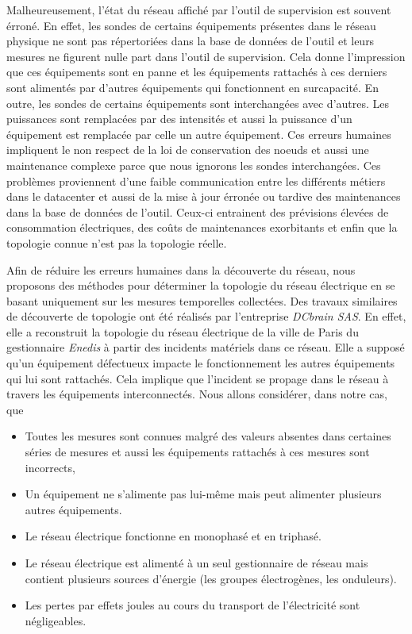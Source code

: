 Malheureusement,  l'\'etat du r\'eseau affich\'e par l'outil de supervision est souvent \'erron\'e. 
En effet,  les sondes de certains \'equipements pr\'esentes dans le r\'eseau physique ne sont pas r\'epertori\'ees dans la base de donn\'ees de l'outil et leurs mesures ne figurent nulle part dans l'outil de supervision. Cela donne l'impression que ces \'equipements sont en panne et  les \'equipements rattach\'es \`a ces derniers sont aliment\'es par d'autres \'equipements qui fonctionnent en surcapacit\'e.  
En outre, les sondes de certains \'equipements sont interchang\'ees avec d'autres. Les puissances sont remplac\'ees par des intensit\'es et aussi la puissance d'un \'equipement est remplac\'ee par celle  un autre \'equipement. Ces erreurs humaines impliquent le non respect de la loi de conservation des noeuds et aussi une maintenance complexe  parce que nous ignorons les sondes interchang\'ees.
Ces probl\`emes proviennent d'une faible communication  entre les diff\'erents m\'etiers dans le datacenter et aussi de la mise \`a jour \'erron\'ee ou tardive des maintenances dans la base de donn\'ees de l'outil. 
Ceux-ci entrainent  des pr\'evisions \'elev\'ees de consommation \'electriques, des co\^uts de maintenances exorbitants et enfin que la topologie connue n'est pas la topologie r\'eelle.
\newline

Afin de r\'eduire les erreurs humaines dans la d\'ecouverte du r\'eseau, nous proposons des m\'ethodes pour d\'eterminer la topologie du r\'eseau \'electrique en se basant uniquement sur les mesures temporelles collect\'ees. 
Des travaux similaires de d\'ecouverte de topologie ont \'et\'e r\'ealis\'es par l'entreprise {\em DCbrain SAS}. En effet, elle a reconstruit la topologie du r\'eseau \'electrique de la ville de Paris du gestionnaire {\em Enedis} \`a partir des incidents mat\'eriels dans ce r\'eseau. Elle a suppos\'e qu'un \'equipement d\'efectueux impacte le fonctionnement les autres \'equipements qui lui sont rattach\'es. Cela implique que l'incident se propage dans le r\'eseau \`a travers les \'equipements interconnect\'es.
\newline
Nous allons consid\'erer, dans notre cas, que 
\begin{itemize}
\item Toutes les mesures sont connues malgr\'e des valeurs absentes dans certaines s\'eries de mesures et aussi les \'equipements rattach\'es \`a ces mesures sont incorrects, 
\item Un \'equipement ne s'alimente pas lui-m\^eme mais peut alimenter plusieurs autres \'equipements.
\item Le r\'eseau \'electrique fonctionne en monophas\'e et en triphas\'e. 
\item Le r\'eseau \'electrique est aliment\'e \`a un seul gestionnaire de r\'eseau mais contient plusieurs sources d'\'energie (les groupes \'electrog\`enes, les onduleurs).
\item Les pertes par effets joules au cours du transport de l'\'electricit\'e sont n\'egligeables.
\end{itemize}


